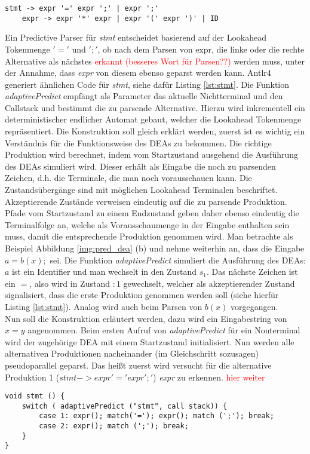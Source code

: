 \begin{lstlisting}[style=grammar, label=lst:expr_grammar]
    stmt -> expr '=' expr ';' | expr ';'
    expr -> expr '*' expr | expr '(' expr ')' | ID
\end{lstlisting}

Ein Predictive Parser für \textit{stmt} entscheidet basierend auf der Lookahead Tokenmenge ${'='}$ und ${';'}$, ob nach dem Parsen von expr, die linke oder die rechte Alternative
als nächstes \textcolor{red}{erkannt (besseres Wort für Parsen??)} werden muss, unter der Annahme, dass \textit{expr} von diesem ebenso geparst werden kann.
Antlr4 generiert ähnlichen Code für \textit{stmt}, siehe dafür Listing \ref{lst:stmt}.
Die Funktion \textit{adaptivePredict} empfängt als Parameter das aktuelle Nichtterminal und den Callstack und bestimmt die zu parsende Alternative.
Hierzu wird inkrementell ein deterministischer endlicher Automat gebaut, welcher die Lookahead Tokenmenge repräsentiert. 
Die Konstruktion soll gleich erklärt werden, zuerst ist es wichtig ein Verständnis für die Funktionsweise des DEAs zu bekommen. 
Die richtige Produktion wird berechnet, indem vom Startzustand ausgehend die Ausführung des DEAs simuliert wird. Dieser erhält als Eingabe die noch zu parsenden Zeichen, d.h. die Terminale, die man noch vorausschauen kann.
Die Zustandsübergänge sind mit möglichen Lookahead Terminalen beschriftet. Akzeptierende Zustände verweisen eindeutig auf die zu parsende Produktion. Pfade vom Startzustand zu einem Endzustand
geben daher ebenso eindeutig die Terminalfolge an, welche als Vorausschaumenge in der Eingabe enthalten sein muss, damit die entsprechende Produktion genommen wird. 
Man betrachte als Beispiel Abbildung \ref{img:pred_dea} (b) und nehme weiterhin an, dass die Eingabe $a=b(x);$ sei. 
Die Funktion \textit{adaptivePredict} simuliert die Ausführung des DEAs: $a$ ist ein Identifier und man wechselt in den Zustand $s_1$. Das nächste Zeichen ist ein $=$, also 
wird in Zustand $:1$ gewechselt, welcher als akzeptierender Zustand signalisiert, dass die erste Produktion genommen werden soll (siehe hierfür Listing \ref{lst:stmt}). 
Analog wird auch beim Parsen von $b(x)$ vorgegangen.\\
Nun soll die Konstruktion erläutert werden, dazu wird ein Eingabestring von $x=y$ angenommen.
Beim ersten Aufruf von \textit{adaptivePredict} für ein Nonterminal wird der zugehörige DEA mit einem Startzustand initialisiert. 
Nun werden alle alternativen Produktionen nacheinander (im Gleichschritt sozusagen) pseudoparallel geparst.
Das heißt zuerst wird versucht für die alternative Produktion 1 ($stmt -> expr '=' expr ';'$) \textit{expr} zu erkennen. 
\textcolor{red}{hier weiter}  


\begin{lstlisting}[style=CStyle, frame=b, caption=Code zum Erkennen von stmt,label=lst:stmt]   
void stmt () { 
    switch ( adaptivePredict ("stmt", call stack)) {
        case 1: expr(); match('='); expr(); match (';'); break;
        case 2: expr(); match (';'); break;
    }   
}
\end{lstlisting}



